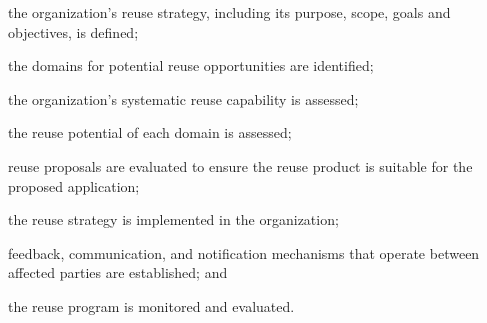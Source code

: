 			\begin{adjustwidth}{2em}{0pt} 

				\begin{compactitem}

					\item the organization's reuse strategy, including its purpose, scope, goals and objectives, is defined;

					\item the domains for potential reuse opportunities are identified;

					\item the organization's systematic reuse capability is assessed;

					\item the reuse potential of each domain is assessed;

					\item reuse proposals are evaluated to ensure the reuse product is suitable for the proposed application;

					\item the reuse strategy is implemented in the organization;

					\item feedback, communication, and notification mechanisms that operate between affected parties are established; and

					\item the reuse program is monitored and evaluated.

				\end{compactitem}

			\end{adjustwidth}

